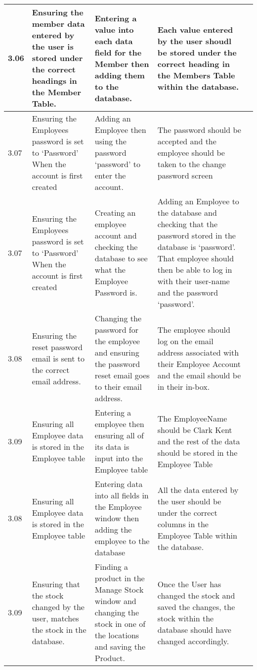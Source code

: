 \begin{flushleft}
\begin{longtable}{|p{1cm}|p{2.5cm}|p{2.5cm}|p{2cm}|p{2cm}|}
	\rowcolor{light-grey}3.06 & Ensuring the member data entered by the user is stored under the correct headings in the Member Table. & Entering a value into each data field for the Member then adding them to the database. & Each value entered by the user shoudl be stored under the correct heading in the Members Table within the database. & \\ \hline
	\rowcolor{dark-grey}3.07 & Ensuring the Employees password is set to `Password' When the account is first created & Adding an Employee then using the password `password' to enter the account. & The password should be accepted and the employee should be taken to the change password screen& \\ \hline
	\rowcolor{light-grey}3.07 & Ensuring the Employees password is set to `Password' When the account is first created & Creating an employee account and checking the database to see what the Employee Password is. & Adding an Employee to the database and checking that the password stored in the database is `password'. That employee should then be able to log in with their user-name and the password `password'. & \\ \hline
	\rowcolor{dark-grey}3.08 & Ensuring the reset password email is sent to the correct email address. & Changing the password for the employee and ensuring the password reset email goes to their email address. & The employee should log on the email address associated with their Employee Account and the email should be in their in-box.& \\ \hline
	\rowcolor{dark-grey}3.09 & Ensuring all Employee data is stored in the Employee table & Entering a employee then ensuring all of its data is input into the Employee table & The EmployeeName should be Clark Kent and the rest of the data should be stored in the Employee Table & \\ \hline
	\rowcolor{light-grey}3.08 & Ensuring all Employee data is stored in the Employee table & Entering data into all fields in the Employee window then adding the employee to the database & All the data entered by the user should be under the correct columns in the Employee Table within the database. & \\ \hline
	\rowcolor{light-grey}3.09 & Ensuring that the stock changed by the user, matches the stock in the database. & Finding a product in the Manage Stock window and changing the stock in one of the locations and saving the Product. & Once the User has changed the stock and saved the changes, the stock within the database should have changed accordingly. & \\ \hline

\end{longtable}
\end{flushleft}
